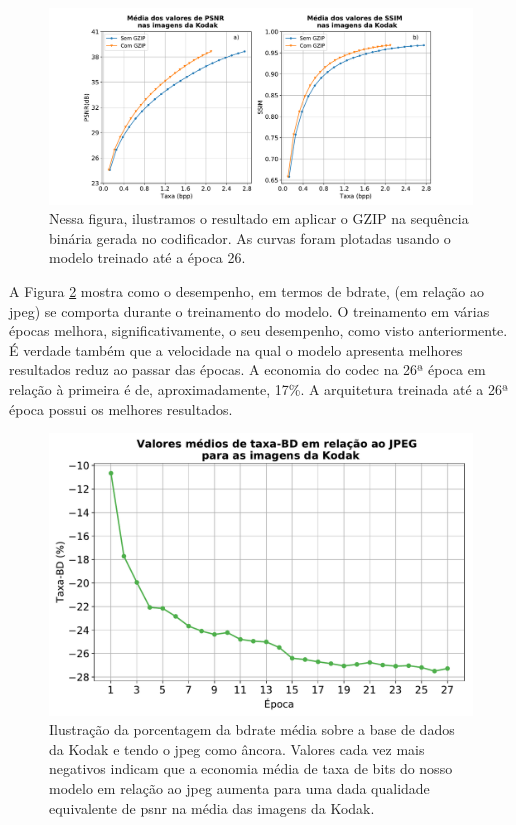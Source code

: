 \begin{figure}
	\centering
	\includegraphics[width=1.1\textwidth]{figuras/gain_gzip_media.pdf}
	\caption[Curvas antes e após codificação com o GZIP]{Nessa figura, ilustramos o resultado em aplicar o GZIP na sequência binária gerada no codificador. As curvas foram plotadas usando o modelo treinado até a época 26.}  	
	\label{fig:gain_gzip_meida}
\end{figure}

A Figura \ref{fig:taxa_bd} mostra como o desempenho, em termos de \acrshort{bdrate}, (em relação ao \acrshort{jpeg}) se comporta durante o treinamento do modelo. O treinamento em várias épocas melhora, significativamente, o seu desempenho, como visto anteriormente. É verdade também que a velocidade na qual o modelo apresenta melhores resultados reduz ao passar das épocas. A economia do \acrshort{codec} na 26ª época em relação à primeira é de, aproximadamente, 17\%. A arquitetura treinada até a 26ª época possui os melhores resultados. 


\begin{figure}
	\centering
	\includegraphics[width=1\textwidth]{figuras/taxa_bd_27epocas.pdf}
	\caption[Curva de \acrshort{bdrate} por época de treinamento.]{Ilustração da porcentagem da \acrshort{bdrate} média sobre a base de dados da Kodak e tendo o \acrshort{jpeg} como âncora.  Valores cada vez mais negativos indicam que a economia média de taxa de bits do nosso modelo em relação ao \acrshort{jpeg} aumenta para uma dada qualidade equivalente de \acrshort{psnr} na média das imagens da Kodak.}  
	\label{fig:taxa_bd}
\end{figure}	

